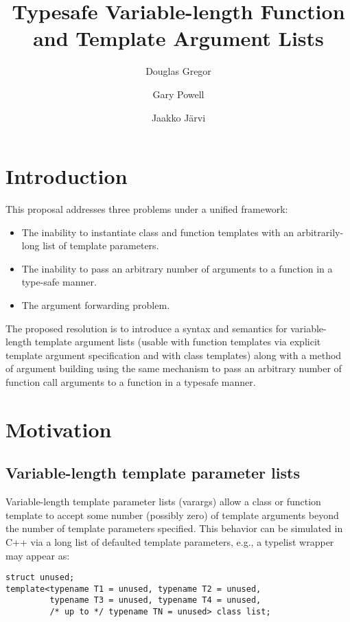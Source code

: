 \documentclass{article}
\begin{document}
\pagestyle{myheadings}

\title{Typesafe Variable-length Function and Template Argument Lists}
\author{Douglas Gregor \and Gary Powell \and Jaakko J\"arvi}
\maketitle

\section{Introduction}
This proposal addresses three problems under a unified framework:
\begin{itemize}
\item The inability to instantiate class and function templates with an arbitrarily-long list of template parameters.
\item The inability to pass an arbitrary number of arguments to a function in a type-safe manner.
\item The argument forwarding problem.
\end{itemize}

The proposed resolution is to introduce a syntax and semantics for
variable-length template argument lists (usable with function templates
via explicit template argument specification and with class templates)
along with a method of argument building using the same mechanism to
pass an arbitrary number of function call arguments to a function in a
typesafe manner.

\section{Motivation}
\subsection{Variable-length template parameter lists}
Variable-length template parameter lists (varargs) allow a class or
function template to accept some number (possibly zero) of template
arguments beyond the number of template parameters specified. This
behavior can be simulated in C++ via a long list of defaulted template
parameters, e.g., a typelist wrapper may appear as:

\begin{verbatim}
struct unused;
template<typename T1 = unused, typename T2 = unused, 
         typename T3 = unused, typename T4 = unused, 
         /* up to */ typename TN = unused> class list;
\end{verbatim}
\end{document}
